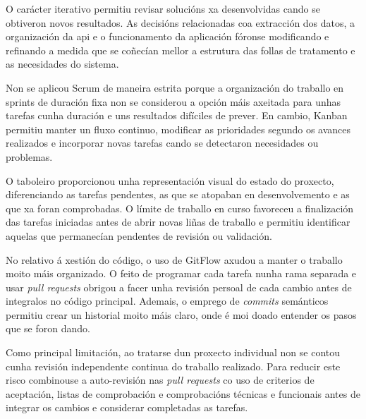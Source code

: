 O carácter iterativo permitiu revisar solucións xa desenvolvidas cando se obtiveron novos resultados. As decisións relacionadas coa extracción dos datos, a organización da \gls{api} e o funcionamento da aplicación fóronse modificando e refinando a medida que se coñecían mellor a estrutura das follas de tratamento e as necesidades do sistema.

Non se aplicou Scrum de maneira estrita porque a organización do traballo en sprints de duración fixa non se considerou a opción máis axeitada para unhas tarefas cunha duración e uns resultados difíciles de prever. En cambio, Kanban permitiu manter un fluxo continuo, modificar as prioridades segundo os avances realizados e incorporar novas tarefas cando se detectaron necesidades ou problemas.

O taboleiro proporcionou unha representación visual do estado do proxecto, diferenciando as tarefas pendentes, as que se atopaban en desenvolvemento e as que xa foran comprobadas. O límite de traballo en curso favoreceu a finalización das tarefas iniciadas antes de abrir novas liñas de traballo e permitiu identificar aquelas que permanecían pendentes de revisión ou validación.

No relativo á xestión do código, o uso de GitFlow axudou a manter o traballo moito máis organizado. O feito de programar cada tarefa nunha rama separada e usar \textit{pull requests} obrigou a facer unha revisión persoal de cada cambio antes de integralos no código principal. Ademais, o emprego de \textit{commits} semánticos permitiu crear un historial moito máis claro, onde é moi doado entender os pasos que se foron dando.

Como principal limitación, ao tratarse dun proxecto individual non se contou cunha revisión independente continua do traballo realizado. Para reducir este risco combinouse a auto-revisión nas \textit{pull requests} co uso de criterios de aceptación, listas de comprobación e comprobacións técnicas e funcionais antes de integrar os cambios e considerar completadas as tarefas.